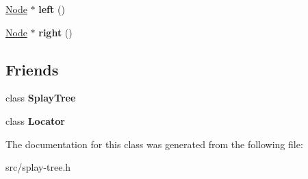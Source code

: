 \begin{DoxyCompactItemize}
\item 
\hypertarget{classv8_1_1internal_1_1_splay_tree_1_1_node_a7c52ec777cb6f8e30e1b40429cd8dc12}{}\hyperlink{classv8_1_1internal_1_1_splay_tree_1_1_node}{Node} $\ast$ {\bfseries left} ()\label{classv8_1_1internal_1_1_splay_tree_1_1_node_a7c52ec777cb6f8e30e1b40429cd8dc12}

\item 
\hypertarget{classv8_1_1internal_1_1_splay_tree_1_1_node_a4fa249e21bb6d3d170b34bbd4180e36a}{}\hyperlink{classv8_1_1internal_1_1_splay_tree_1_1_node}{Node} $\ast$ {\bfseries right} ()\label{classv8_1_1internal_1_1_splay_tree_1_1_node_a4fa249e21bb6d3d170b34bbd4180e36a}

\end{DoxyCompactItemize}
\subsection*{Friends}
\begin{DoxyCompactItemize}
\item 
\hypertarget{classv8_1_1internal_1_1_splay_tree_1_1_node_a2070fb75b364a2c030d578a4b59fa43b}{}class {\bfseries Splay\+Tree}\label{classv8_1_1internal_1_1_splay_tree_1_1_node_a2070fb75b364a2c030d578a4b59fa43b}

\item 
\hypertarget{classv8_1_1internal_1_1_splay_tree_1_1_node_ae6c3d73810195cfbdd05d23c5389df89}{}class {\bfseries Locator}\label{classv8_1_1internal_1_1_splay_tree_1_1_node_ae6c3d73810195cfbdd05d23c5389df89}

\end{DoxyCompactItemize}


The documentation for this class was generated from the following file\+:\begin{DoxyCompactItemize}
\item 
src/splay-\/tree.\+h\end{DoxyCompactItemize}
